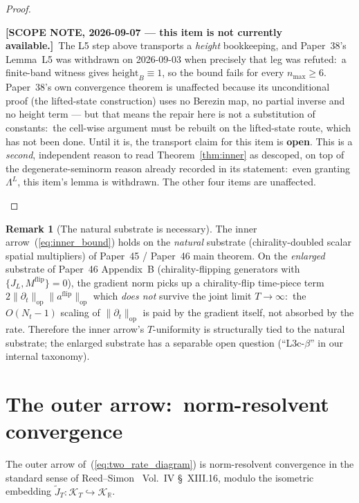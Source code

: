 \documentclass[11pt,a4paper]{article}
\theoremstyle{plain}
\theoremstyle{definition}
\newtheorem{remark}[theorem]{Remark}
\newcommand{\nmax}{n_{\max}}
\newcommand{\Nt}{N_{t}}
\newcommand{\Krein}{\mathcal{K}}
\newcommand{\opnorm}[1]{\lVert #1 \rVert_{\mathrm{op}}}
\newcommand{\R}{\mathbb{R}}
\newcommand{\JL}{J_{L}}
\newcommand{\JT}{\widetilde{J}_{T}}
\newcommand{\Lprop}{\Lambda^{L}}
\newcommand{\flip}{\mathrm{flip}}
\begin{document}
\begin{proof}
\begin{itemize}
\textbf{[SCOPE NOTE, 2026-09-07 --- this item is not currently
available.]}\ The L5 step above transports a \emph{height} bookkeeping,
and Paper~38's Lemma~L5 was withdrawn on 2026-09-03 when precisely that
leg was refuted:\ a finite-band witness gives $\mathrm{height}_B \equiv
1$, so the bound fails for every $\nmax \ge 6$.  Paper~38's own
convergence theorem is unaffected because its unconditional proof (the
lifted-state construction) uses no Berezin map, no partial inverse and
no height term --- but that means the repair here is not a
substitution of constants:\ the cell-wise argument must be rebuilt on
the lifted-state route, which has not been done.  Until it is, the
transport claim for this item is \textbf{open}.  This is a
\emph{second}, independent reason to read Theorem~\ref{thm:inner} as
descoped, on top of the degenerate-seminorm reason already recorded in
its statement:\ even granting $\Lprop$, this item's lemma is withdrawn.
The other four items are unaffected.
\end{itemize}
\end{proof}

\begin{remark}[The natural substrate is necessary]
The inner arrow~(\ref{eq:inner_bound}) holds on the
\emph{natural} substrate (chirality-doubled scalar spatial multipliers)
of Paper~45 / Paper~46 main theorem. On the \emph{enlarged} substrate
of Paper~46 Appendix~B (chirality-flipping generators with
$\{\JL, M^{\flip}\} = 0$), the gradient norm picks up a chirality-flip
time-piece term $2\opnorm{\partial_{t}} \opnorm{a^{\flip}}$ which
\emph{does not} survive the joint limit $T \to \infty$:\ the
$O(\Nt - 1)$ scaling of $\opnorm{\partial_{t}}$ is paid by the gradient
itself, not absorbed by the rate. Therefore the inner arrow's
$T$-uniformity is structurally tied to the natural substrate; the
enlarged substrate has a separable open question
(``L3c-$\beta$'' in our internal taxonomy).
\end{remark}

\section{The outer arrow:\ norm-resolvent convergence}\label{sec:outer}

The outer arrow of~(\ref{eq:two_rate_diagram}) is norm-resolvent
convergence in the standard sense of Reed--Simon~\cite{reed_simon_iv}
Vol.~IV \S~XIII.16, modulo the isometric embedding
$\JT : \Krein_{T} \hookrightarrow \Krein_{\R}$.
\end{document}
